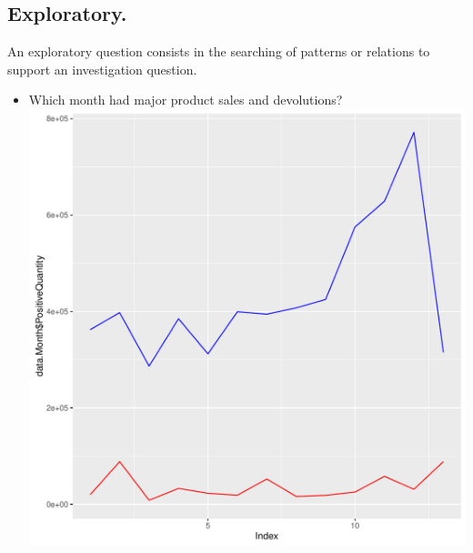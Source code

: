 \documentclass[conference]{IEEEtran}\usepackage[]{graphicx}\usepackage[]{color}
\makeatletter
\def\maxwidth{ %
  \ifdim\Gin@nat@width>\linewidth
    \linewidth
  \else
    \Gin@nat@width
  \fi
}
\newenvironment{knitrout}{}{} %
\makeatother
\begin{document}
  \subsection{Exploratory.}
   An exploratory question consists in the searching of patterns or relations to support an investigation question.
  \begin{itemize}
   \item Which month had major product sales and devolutions?
\begin{knitrout}
\color{fgcolor}
\includegraphics[width=\maxwidth]{figure/monthMajorSalesDevolutionsQuantity-1} 

\end{knitrout}


\end{itemize}
\end{document}
